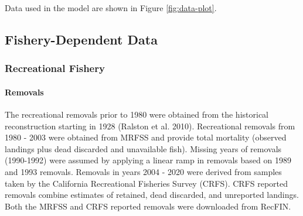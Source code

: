 \documentclass[11pt,
  english,
  a4paper,
]{article}
\begin{document}
\leavevmode\tagmcend\tagstructend


Data used in the model are shown in Figure \ref{fig:data-plot}.

\leavevmode\tagmcend\tagstructend\par


\hypertarget{fishery-dependent-data}{%
\subsection{Fishery-Dependent Data}\label{fishery-dependent-data}}

\leavevmode\tagmcend\tagstructend


\hypertarget{recreational-fishery}{%
\subsubsection{Recreational Fishery}\label{recreational-fishery}}

\leavevmode\tagmcend\tagstructend


\hypertarget{removals}{%
\paragraph{Removals}\label{removals}}

\leavevmode\tagmcend\tagstructend


The recreational removals prior to 1980 were obtained from the historical reconstruction starting in 1928 {(Ralston et al. 2010)\leavevmode\tagmcend\tagstructend}. Recreational removals from 1980 - 2003 were obtained from MRFSS and provide total mortality (observed landings plus dead discarded and unavailable fish). Missing years of removals (1990-1992) were assumed by applying a linear ramp in removals based on 1989 and 1993 removals. Removals in years 2004 - 2020 were derived from samples taken by the California Recreational Fisheries Survey (CRFS). CRFS reported removals combine estimates of retained, dead discarded, and unreported landings. Both the MRFSS and CRFS reported removals were downloaded from RecFIN.
\end{document}
